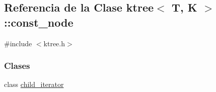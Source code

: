 \hypertarget{classktree_1_1const__node}{}\subsection{Referencia de la Clase ktree$<$ T, K $>$\+:\+:const\+\_\+node}
\label{classktree_1_1const__node}


{\ttfamily \#include $<$ktree.\+h$>$}

\subsubsection*{Clases}
\begin{DoxyCompactItemize}
\item 
class \hyperlink{classktree_1_1const__node_1_1child__iterator}{child\+\_\+iterator}
\end{DoxyCompactItemize}
